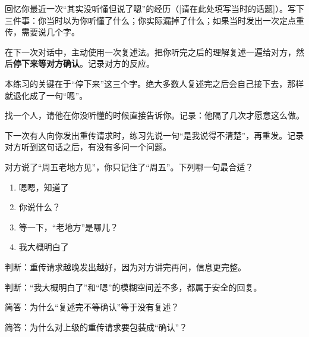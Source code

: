 \begin{exercisessec}
\item 回忆你最近一次“其实没听懂但说了嗯”的经历（[请在此处填写当时的话题]）。写下三件事：你当时以为你听懂了什么；你实际漏掉了什么；如果当时发出一次定点重传，需要说几个字。

\item 在下一次对话中，主动使用一次复述法。把你听完之后的理解复述一遍给对方，然后\textbf{停下来等对方确认}。记录对方的反应。

\begin{mdquote}
本练习的关键在于“停下来”这三个字。绝大多数人复述完之后会自己接下去，那样就退化成了一句“嗯”。
\end{mdquote}

\item 找一个人，请他在你没听懂的时候直接告诉你。记录：他隔了几次才愿意这么做。

\item 下一次有人向你发出重传请求时，练习先说一句“是我说得不清楚”，再重发。记录对方听到这句话之后，有没有多问一个问题。
\end{exercisessec}

\begin{quizsec}
\item 对方说了“周五老地方见”，你只记住了“周五”。下列哪一句最合适？

\begin{enumerate}[label=\Alph*., leftmargin=2.2em, labelsep=0.6em,
                  itemsep=0.2em, topsep=0.3em, parsep=0.1em]
\item 嗯嗯，知道了
\item 你说什么？
\item 等一下，“老地方”是哪儿？
\item 我大概明白了
\end{enumerate}

\item 判断：重传请求越晚发出越好，因为对方讲完再问，信息更完整。

\item 判断：“我大概明白了”和“嗯”的模糊空间差不多，都属于安全的回复。

\item 简答：为什么“复述完不等确认”等于没有复述？

\item 简答：为什么对上级的重传请求要包装成“确认”？
\end{quizsec}

